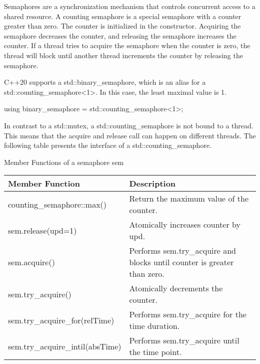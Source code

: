 Semaphores are a synchronization mechanism that controls concurrent access to a shared resource. A counting semaphore is a special semaphore with a counter greater than zero. The counter is initialized in the constructor. Acquiring the semaphore decreases the counter, and releasing the semaphore increases the counter. If a thread tries to acquire the semaphore when the counter is zero, the thread will block until another thread increments the counter by releasing the semaphore.

C++20 supports a std::binary\_semaphore, which is an alias for a std::counting\_semaphore<1>. In this case, the least maximal value is 1.

\begin{cpp}
using binary_semaphore = std::counting_semaphore<1>;
\end{cpp}

In contrast to a std::mutex, a std::counting\_semaphore is not bound to a thread. This means that the acquire and release call can happen on different threads. The following table presents the interface of a std::counting\_semaphore.

\begin{center}
Member Functions of a semaphore sem
\end{center}

\begin{longtable}[c]{|l|l|}
\hline
\textbf{Member Function}         & \textbf{Description}                             \\ \hline
\endfirsthead
%
\endhead
%
counting\_semaphore::max()       & Return the maximum value of the counter.         \\ \hline
sem.release(upd=1)               & Atomically increases counter by upd.             \\ \hline
sem.acquire() & Performs sem.try\_acquire and blocks until counter is greater than zero. \\ \hline
sem.try\_acquire()               & Atomically decrements the counter.               \\ \hline
sem.try\_acquire\_for(relTime)   & Performs sem.try\_acquire for the time duration. \\ \hline
sem.try\_acquire\_intil(absTime) & Performs sem.try\_acquire until the time point.  \\ \hline
\end{longtable}

